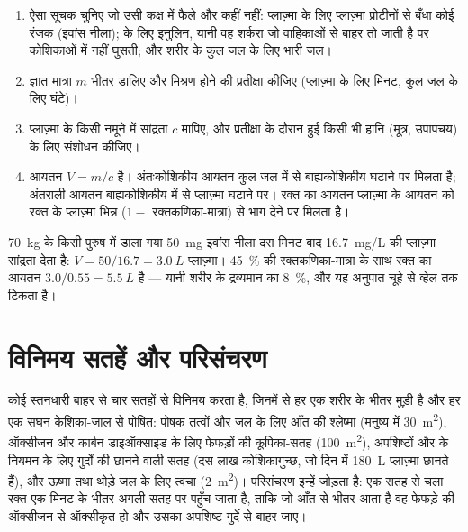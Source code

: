 \begin{method}[तनूकरण से किसी कक्ष का मापन]\label{met:b1:mammal-organization:dilution}
\begin{enumerate}
  \item ऐसा सूचक चुनिए जो उसी कक्ष में फैले और कहीं नहीं: प्लाज़्मा के
        लिए प्लाज़्मा प्रोटीनों से बँधा कोई रंजक (इवांस नीला);
         के लिए इनुलिन, यानी वह शर्करा जो वाहिकाओं से
        बाहर तो जाती है पर कोशिकाओं में नहीं घुसती; और शरीर के कुल जल के
        लिए भारी जल।
  \item ज्ञात मात्रा $m$ भीतर डालिए और मिश्रण होने की प्रतीक्षा कीजिए
        (प्लाज़्मा के लिए मिनट, कुल जल के लिए घंटे)।
  \item प्लाज़्मा के किसी नमूने में सांद्रता $c$ मापिए, और प्रतीक्षा के
        दौरान हुई किसी भी हानि (मूत्र, उपापचय) के लिए संशोधन कीजिए।
  \item आयतन $V = m/c$ है। अंतःकोशिकीय आयतन कुल जल में से बाह्यकोशिकीय
        घटाने पर मिलता है; अंतराली आयतन बाह्यकोशिकीय में से प्लाज़्मा
        घटाने पर। रक्त का आयतन प्लाज़्मा के आयतन को रक्त के प्लाज़्मा
        भिन्न ($1 - $ रक्तकणिका-मात्रा) से भाग देने पर मिलता है।
\end{enumerate}
\end{method}

\begin{example}[एक प्लाज़्मा आयतन]\label{ex:b1:mammal-organization:evansblue}
\qty{70}{kg} के किसी पुरुष में डाला गया \qty{50}{mg} इवांस नीला दस मिनट
बाद \qty{16.7}{mg/L} की प्लाज़्मा सांद्रता देता है:
$V = 50/16.7 = \qty{3.0}{L}$ प्लाज़्मा। \qty{45}{\%} की
रक्तकणिका-मात्रा के साथ रक्त का आयतन $3.0/0.55 = \qty{5.5}{L}$ है ---
यानी शरीर के द्रव्यमान का \qty{8}{\%}, और यह अनुपात चूहे से व्हेल तक
टिकता है।
\end{example}

\section{विनिमय सतहें और परिसंचरण}

\begin{proposition}[हर विनिमय सतह रक्त से युग्मित है]\label{prop:b1:mammal-organization:surfaces}
कोई स्तनधारी बाहर से चार सतहों से विनिमय करता है, जिनमें से हर एक शरीर
के भीतर मुड़ी है और हर एक सघन केशिका-जाल से पोषित: पोषक तत्वों और जल के
लिए आँत की श्लेष्मा (मनुष्य में \qty{30}{m^2}), ऑक्सीजन और कार्बन
डाइऑक्साइड के लिए फेफड़ों की कूपिका-सतह (\qty{100}{m^2}), अपशिष्टों और
 के नियमन के लिए गुर्दों की छानने वाली सतह (दस लाख
कोशिकागुच्छ, जो दिन में \qty{180}{L} प्लाज़्मा छानते हैं), और ऊष्मा तथा
थोड़े जल के लिए त्वचा (\qty{2}{m^2})। परिसंचरण इन्हें जोड़ता है: एक सतह
से चला रक्त एक मिनट के भीतर अगली सतह पर पहुँच जाता है, ताकि जो आँत से
भीतर आता है वह फेफड़े की ऑक्सीजन से ऑक्सीकृत हो और उसका अपशिष्ट गुर्दे
से बाहर जाए।
\end{proposition}

